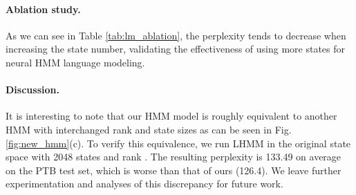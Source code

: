 \documentclass[11pt]{article}
\begin{document}
\paragraph{Ablation study.} 
As we can see in Table \ref{tab:lm_ablation}, the perplexity tends to decrease when increasing the state number, validating the effectiveness of using more states for neural HMM language modeling.

\begin{table}[tb!]
    \centering 
    \caption{Perplexity with varying numbers of states. Following \citet{chiu2021low}, we fix the rank to 2048 for faster ablation studies.}
    \label{tab:lm_ablation}
\end{table}

\paragraph{Discussion.} It is interesting to note that our HMM model is roughly equivalent to another HMM with interchanged rank and state sizes as can be seen in Fig.\ref{fig:new_hmm}(c). To verify this equivalence, we run LHMM in the original state space with 2048 states and rank . The resulting perplexity is 133.49 on average on the PTB test set, which is worse than that of ours (126.4). 
We leave further experimentation and analyses of this discrepancy for future work.
\end{document}
